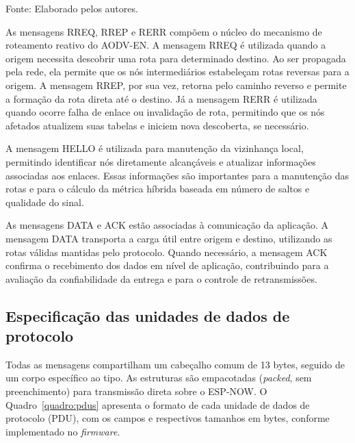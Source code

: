 Fonte: Elaborado pelos autores.

As mensagens RREQ, RREP e RERR compõem o núcleo do mecanismo de
roteamento reativo do AODV-EN. A mensagem RREQ é utilizada quando a
origem necessita descobrir uma rota para determinado destino. Ao ser
propagada pela rede, ela permite que os nós intermediários estabeleçam
rotas reversas para a origem. A mensagem RREP, por sua vez, retorna pelo
caminho reverso e permite a formação da rota direta até o destino. Já a
mensagem RERR é utilizada quando ocorre falha de enlace ou invalidação
de rota, permitindo que os nós afetados atualizem suas tabelas e iniciem
nova descoberta, se necessário.

A mensagem HELLO é utilizada para manutenção da vizinhança local,
permitindo identificar nós diretamente alcançáveis e atualizar
informações associadas aos enlaces. Essas informações são importantes
para a manutenção das rotas e para o cálculo da métrica híbrida baseada
em número de saltos e qualidade do sinal.

As mensagens DATA e ACK estão associadas à comunicação da aplicação. A
mensagem DATA transporta a carga útil entre origem e destino, utilizando
as rotas válidas mantidas pelo protocolo. Quando necessário, a mensagem
ACK confirma o recebimento dos dados em nível de aplicação, contribuindo
para a avaliação da confiabilidade da entrega e para o controle de
retransmissões.

\subsection{Especificação das unidades de dados de protocolo}\label{especificacao-pdus}

Todas as mensagens compartilham um cabeçalho comum de 13 bytes,
seguido de um corpo específico ao tipo. As estruturas são empacotadas
(\emph{packed}, sem preenchimento) para transmissão direta sobre o
ESP-NOW. O Quadro~\ref{quadro:pdus} apresenta o formato de cada unidade
de dados de protocolo (PDU), com os campos e respectivos tamanhos em
bytes, conforme implementado no \emph{firmware}.

